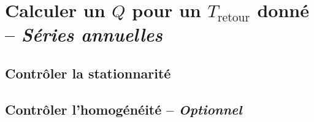 \chapter{Calculer un $Q$ pour un $T_\text{retour}$ donné -- \textit{Séries annuelles}}

\section{Contrôler la stationnarité}
\section{Contrôler l'homogénéité -- \textit{Optionnel}}
